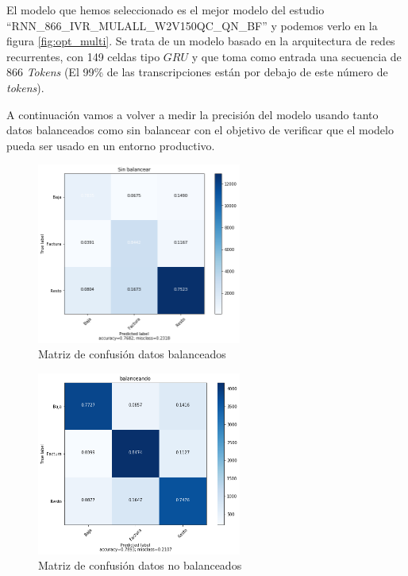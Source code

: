 El modelo que hemos seleccionado es el mejor modelo del estudio ``RNN\_866\_IVR\_MULALL\_W2V150QC\_QN\_BF'' y podemos verlo en la figura \ref{fig:opt_multi}. Se trata de un modelo basado en la arquitectura de redes recurrentes, con 149 celdas tipo $GRU$ y que toma como entrada una secuencia de 866 \textit{Tokens} (El 99\% de las transcripciones están por debajo de este número de \textit{tokens}).

A continuación vamos a volver a medir la precisión del modelo usando tanto datos balanceados como sin balancear con el objetivo de verificar que el modelo pueda ser usado en un entorno productivo.


\begin{figure}[!ht]
	\centering
	\includegraphics[width=0.6\textwidth]{images/super/mvp_mat1}
	\caption{Matriz de confusión datos balanceados}
	\label{fig:mvp_mat1}
\end{figure}


\begin{figure}[!ht]
	\centering
	\includegraphics[width=0.6\textwidth]{images/super/mvp_mat2}
	\caption{Matriz de confusión datos no balanceados}
	\label{fig:mvp_mat2}
\end{figure}

